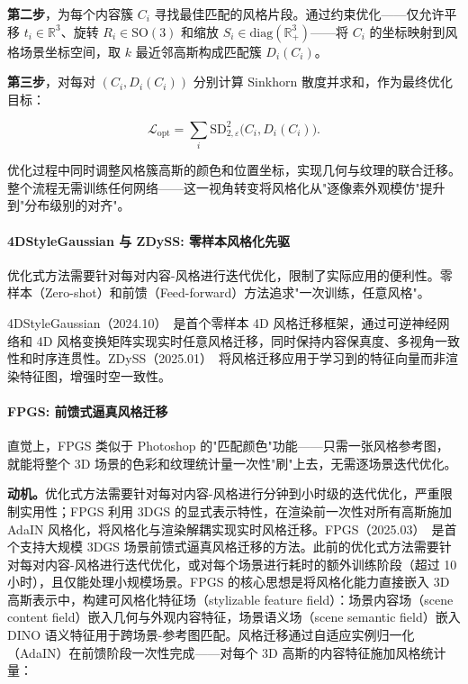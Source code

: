 \textbf{第二步}，为每个内容簇 $C_i$ 寻找最佳匹配的风格片段。通过约束优化——仅允许平移 $t_i \in \mathbb{R}^3$、旋转 $R_i \in \text{SO}(3)$ 和缩放 $S_i \in \text{diag}(\mathbb{R}_+^3)$——将 $C_i$ 的坐标映射到风格场景坐标空间，取 $k$ 最近邻高斯构成匹配簇 $D_i(C_i)$。

\textbf{第三步}，对每对 $(C_i, D_i(C_i))$ 分别计算 Sinkhorn 散度并求和，作为最终优化目标：

\begin{equation}
  \mathcal{L}_{\text{opt}} = \sum_{i} \text{SD}_{2,\varepsilon}^2\bigl(C_i, D_i(C_i)\bigr).
\end{equation}

优化过程中同时调整风格簇高斯的颜色和位置坐标，实现几何与纹理的联合迁移。整个流程无需训练任何网络——这一视角转变将风格化从"逐像素外观模仿"提升到"分布级别的对齐"。

\paragraph{4DStyleGaussian 与 ZDySS: 零样本风格化先驱}

优化式方法需要针对每对内容-风格进行迭代优化，限制了实际应用的便利性。零样本（Zero-shot）和前馈（Feed-forward）方法追求"一次训练，任意风格"。

4DStyleGaussian（2024.10）~\cite{2410_10412}是首个零样本 4D 风格迁移框架，通过可逆神经网络和 4D 风格变换矩阵实现实时任意风格迁移，同时保持内容保真度、多视角一致性和时序连贯性。ZDySS（2025.01）~\cite{2501_03875}将风格迁移应用于学习到的特征向量而非渲染特征图，增强时空一致性。

\paragraph{FPGS: 前馈式逼真风格迁移}

直觉上，FPGS 类似于 Photoshop 的"匹配颜色"功能——只需一张风格参考图，就能将整个 3D 场景的色彩和纹理统计量一次性"刷"上去，无需逐场景迭代优化。

\textbf{动机。}优化式方法需要针对每对内容-风格进行分钟到小时级的迭代优化，严重限制实用性；FPGS 利用 3DGS 的显式表示特性，在渲染前一次性对所有高斯施加 AdaIN 风格化，将风格化与渲染解耦实现实时风格迁移。FPGS（2025.03）~\cite{2503_09635}是首个支持大规模 3DGS 场景前馈式逼真风格迁移的方法。此前的优化式方法需要针对每对内容-风格进行迭代优化，或对每个场景进行耗时的额外训练阶段（超过 10 小时），且仅能处理小规模场景。FPGS 的核心思想是将风格化能力直接嵌入 3D 高斯表示中，构建可风格化特征场（stylizable feature field）：场景内容场（scene content field）嵌入几何与外观内容特征，场景语义场（scene semantic field）嵌入 DINO 语义特征用于跨场景-参考图匹配。风格迁移通过自适应实例归一化（AdaIN）在前馈阶段一次性完成——对每个 3D 高斯的内容特征施加风格统计量：

